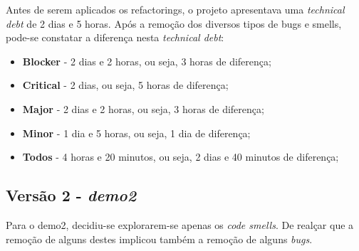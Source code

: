 \documentclass[a4paper]{report}
\begin{document}
Antes de serem aplicados os refactorings, o projeto apresentava uma \textit{technical debt} de 2 dias e 5 horas.
Após a remoção dos diversos tipos de bugs e smells, pode-se constatar a diferença nesta \textit{technical debt}:
\begin{itemize}
    \item \textbf{Blocker} - 2 dias e 2 horas, ou seja, 3 horas de diferença;
    \item \textbf{Critical} - 2 dias, ou seja, 5 horas de diferença;
    \item \textbf{Major} - 2 dias e 2 horas, ou seja, 3 horas de diferença;
    \item \textbf{Minor} - 1 dia e 5 horas, ou seja, 1 dia de diferença;
    \item \textbf{Todos} - 4 horas e 20 minutos, ou seja, 2 dias e 40 minutos de diferença;
\end{itemize}


\subsection{Versão 2 - \textit{demo2}}

Para o demo2, decidiu-se explorarem-se apenas os \textit{code smells}. De realçar que a remoção de alguns destes implicou também a remoção de alguns \textit{bugs}.
\end{document}
